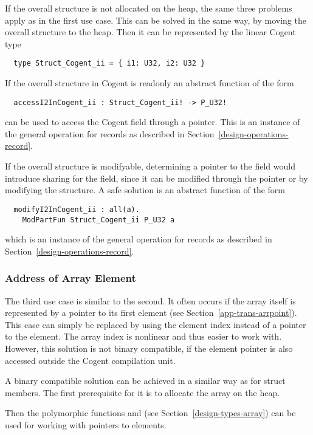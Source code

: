 If the overall structure is not allocated on the heap, the same three problems apply as in the first use case.
This can be solved in the same way, by moving the overall structure to the heap. Then it can be represented
by the linear Cogent type
\begin{verbatim}
  type Struct_Cogent_ii = { i1: U32, i2: U32 }
\end{verbatim}

If the overall structure in Cogent is readonly an abstract function of the form
\begin{verbatim}
  accessI2InCogent_ii : Struct_Cogent_ii! -> P_U32!
\end{verbatim}
can be used to access the Cogent field through a pointer. This is an instance of the general  operation
for records as described in Section~\ref{design-operations-record}.

If the overall structure is modifyable, determining a pointer to the field would introduce sharing for the
field, since it can be modified through the pointer or by modifying the structure. A safe solution is an 
abstract function of the form
\begin{verbatim}
  modifyI2InCogent_ii : all(a). 
    ModPartFun Struct_Cogent_ii P_U32 a
\end{verbatim}
which is an instance of the general  operation
for records as described in Section~\ref{design-operations-record}.

\subsubsection{Address of Array Element}

The third use case is similar to the second. It often occurs if the array itself is represented by a pointer to its first
element (see Section~\ref{app-trans-arrpoint}). This case can simply be replaced by using the element index instead of a 
pointer to the element. The array index is nonlinear and thus easier to work with. However, this solution is not binary
compatible, if the element pointer is also accessed outside the Cogent compilation unit.

A binary compatible solution can be achieved in a similar way as for struct members. The first prerequisite for it is
to allocate the array on the heap.

Then the polymorphic functions  and  (see Section~\ref{design-types-array}) can be used
for working with pointers to elements.

